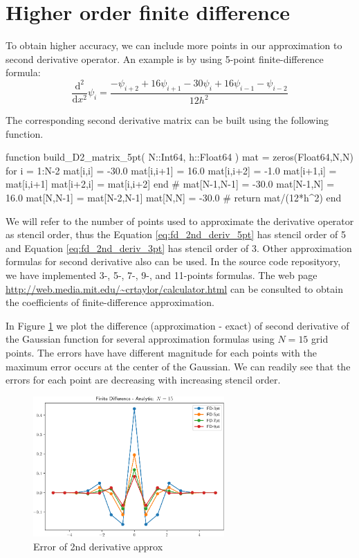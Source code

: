\section{Higher order finite difference}

To obtain higher accuracy, we can include more points in our approximation to second
derivative operator. An example is by using 5-point finite-difference formula:
\begin{equation}
\frac{\mathrm{d}^2}{\mathrm{d}x^2} \psi_{i} =
\frac{-\psi_{i+2} + 16\psi_{i+1} - 30\psi_{i} + 16\psi_{i-1} - \psi_{i-2}}{12h^2}
\label{eq:fd_2nd_deriv_5pt}
\end{equation}

The corresponding second derivative matrix can be built using the following
function.
\begin{juliacode}
function build_D2_matrix_5pt( N::Int64, h::Float64 )
  mat = zeros(Float64,N,N)
  for i = 1:N-2
    mat[i,i] = -30.0
    mat[i,i+1] = 16.0
    mat[i,i+2] = -1.0
    mat[i+1,i] = mat[i,i+1]
    mat[i+2,i] = mat[i,i+2]
  end
  #
  mat[N-1,N-1] = -30.0
  mat[N-1,N] = 16.0
  mat[N,N-1] = mat[N-2,N-1]
  mat[N,N] = -30.0
  #
  return mat/(12*h^2)
end
\end{juliacode}

We will refer to the number of points used to approximate the derivative operator as
stencil order, thus the Equation \eqref{eq:fd_2nd_deriv_5pt} has stencil order of 5
and Equation \eqref{eq:fd_2nd_deriv_3pt} has stencil order of 3.
Other approximation formulas for second derivative also can be used.
In the source code reposityory, we have implemented 3-,
5-, 7-, 9-, and 11-points formulas. The web page
{\footnotesize\url{http://web.media.mit.edu/~crtaylor/calculator.html}}
can be consulted to obtain the
coefficients of finite-difference approximation.

In Figure \ref{fig:fd_2nd_compare_N15} we plot the difference (approximation - exact)
of second derivative of
the Gaussian function for several approximation formulas using $N=15$ grid points.
The errors have have different magnitude for each points with the maximum error
occurs at the center of the Gaussian.
We can readily see that the errors for each point are decreasing with increasing stencil
order.
\begin{figure}[h]
{\center
\includegraphics[width=0.65\textwidth]{../codes/FD1d/IMG_compare_d2_gaussian_error_15.pdf}
\par}
\caption{Error of 2nd derivative approx}
\label{fig:fd_2nd_compare_N15}
\end{figure}


